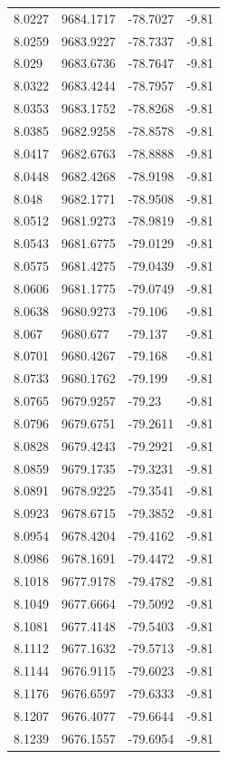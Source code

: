 \begin{table}[H]
\begin{tabular}{llll}
8.0227 & 9684.1717 & -78.7027 & -9.81 \\
8.0259 & 9683.9227 & -78.7337 & -9.81 \\
8.029 & 9683.6736 & -78.7647 & -9.81 \\
8.0322 & 9683.4244 & -78.7957 & -9.81 \\
8.0353 & 9683.1752 & -78.8268 & -9.81 \\
8.0385 & 9682.9258 & -78.8578 & -9.81 \\
8.0417 & 9682.6763 & -78.8888 & -9.81 \\
8.0448 & 9682.4268 & -78.9198 & -9.81 \\
8.048 & 9682.1771 & -78.9508 & -9.81 \\
8.0512 & 9681.9273 & -78.9819 & -9.81 \\
8.0543 & 9681.6775 & -79.0129 & -9.81 \\
8.0575 & 9681.4275 & -79.0439 & -9.81 \\
8.0606 & 9681.1775 & -79.0749 & -9.81 \\
8.0638 & 9680.9273 & -79.106 & -9.81 \\
8.067 & 9680.677 & -79.137 & -9.81 \\
8.0701 & 9680.4267 & -79.168 & -9.81 \\
8.0733 & 9680.1762 & -79.199 & -9.81 \\
8.0765 & 9679.9257 & -79.23 & -9.81 \\
8.0796 & 9679.6751 & -79.2611 & -9.81 \\
8.0828 & 9679.4243 & -79.2921 & -9.81 \\
8.0859 & 9679.1735 & -79.3231 & -9.81 \\
8.0891 & 9678.9225 & -79.3541 & -9.81 \\
8.0923 & 9678.6715 & -79.3852 & -9.81 \\
8.0954 & 9678.4204 & -79.4162 & -9.81 \\
8.0986 & 9678.1691 & -79.4472 & -9.81 \\
8.1018 & 9677.9178 & -79.4782 & -9.81 \\
8.1049 & 9677.6664 & -79.5092 & -9.81 \\
8.1081 & 9677.4148 & -79.5403 & -9.81 \\
8.1112 & 9677.1632 & -79.5713 & -9.81 \\
8.1144 & 9676.9115 & -79.6023 & -9.81 \\
8.1176 & 9676.6597 & -79.6333 & -9.81 \\
8.1207 & 9676.4077 & -79.6644 & -9.81 \\
8.1239 & 9676.1557 & -79.6954 & -9.81 \\

\end{tabular}
\end{table}
